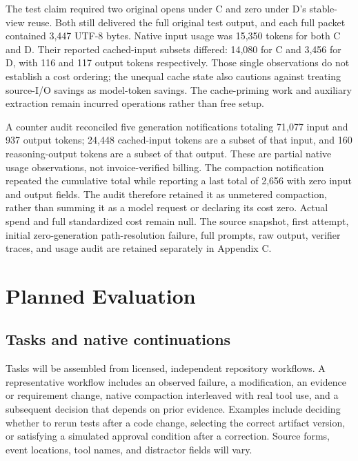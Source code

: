 The test claim required two original opens under C and zero under D's
stable-view reuse. Both still delivered the full original test output,
and each full packet contained 3,447 UTF-8 bytes. Native input usage was
15,350 tokens for both C and D. Their reported cached-input subsets
differed: 14,080 for C and 3,456 for D, with 116 and 117 output tokens
respectively. Those single observations do not establish a cost
ordering; the unequal cache state also cautions against treating
source-I/O savings as model-token savings. The cache-priming work and
auxiliary extraction remain incurred operations rather than free setup.

A counter audit reconciled five generation notifications totaling 71,077
input and 937 output tokens; 24,448 cached-input tokens are a subset of
that input, and 160 reasoning-output tokens are a subset of that output.
These are partial native usage observations, not invoice-verified
billing. The compaction notification repeated the cumulative total while
reporting a last total of 2,656 with zero input and output fields. The
audit therefore retained it as unmetered compaction, rather than summing
it as a model request or declaring its cost zero. Actual spend and full
standardized cost remain null. The source snapshot, first attempt,
initial zero-generation path-resolution failure, full prompts, raw
output, verifier traces, and usage audit are retained separately in
Appendix C.

\section{Planned Evaluation}\label{planned-evaluation}

\subsection{Tasks and native
continuations}\label{tasks-and-native-continuations}

Tasks will be assembled from licensed, independent repository workflows.
A representative workflow includes an observed failure, a modification,
an evidence or requirement change, native compaction interleaved with
real tool use, and a subsequent decision that depends on prior evidence.
Examples include deciding whether to rerun tests after a code change,
selecting the correct artifact version, or satisfying a simulated
approval condition after a correction. Source forms, event locations,
tool names, and distractor fields will vary.


